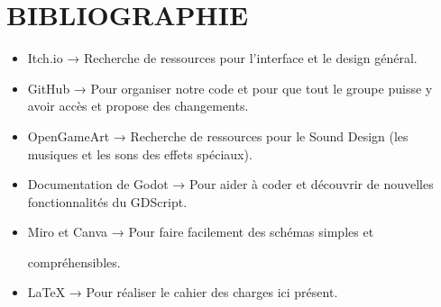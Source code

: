 \documentclass{article}
\begin{document}
\newpage


\section*{BIBLIOGRAPHIE}

\begin{itemize}
    \item Itch.io → Recherche de ressources pour l’interface et le design général.
    \item GitHub → Pour organiser notre code et pour que tout le groupe puisse y avoir accès et propose des changements.
    \item OpenGameArt → Recherche de ressources pour le Sound Design (les musiques et les sons des effets spéciaux).
    \item Documentation de Godot → Pour aider à coder et découvrir de nouvelles fonctionnalités du GDScript.
    \item Miro et Canva → Pour faire facilement des schémas simples et \par compréhensibles.
    \item LaTeX → Pour réaliser le cahier des charges ici présent.
\end{itemize}
\end{document}
